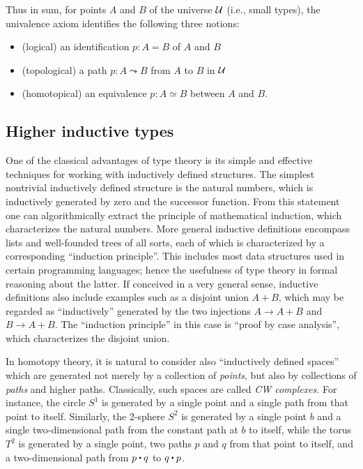 Thus in sum, for points $A$ and $B$ of the universe $\mathcal{U}$ (i.e., small types), the univalence axiom identifies the following three notions:
\begin{itemize}
\item (logical) an identification $p:A=B$ of $A$ and $B$
\item (topological) a path $p:A \leadsto B$ from $A$ to $B$ in $\mathcal{U}$
\item (homotopical) an equivalence $p:A\simeq B$ between $A$ and $B$.
\end{itemize}

\subsection*{Higher inductive types}

One of the classical advantages of type theory is its simple and effective techniques for working with inductively defined structures.
The simplest nontrivial inductively defined structure is the natural numbers, which is inductively generated by zero and the successor function.
From this statement one can algorithmically extract the principle of mathematical induction, which characterizes the natural numbers.
More general inductive definitions encompass lists and well-founded trees of all sorts, each of which is characterized by a corresponding ``induction principle''.
This includes most data structures used in certain programming languages; hence the usefulness of type theory in formal reasoning about the latter.
If conceived in a very general sense, inductive definitions also include examples such as a disjoint union $A+B$, which may be regarded as ``inductively'' generated by the two injections $A\to A+B$ and $B\to A+B$.
The ``induction principle'' in this case is ``proof by case analysis'', which characterizes the disjoint union.

In homotopy theory, it is natural to consider also ``inductively defined spaces'' which are generated not merely by a collection of \emph{points}, but also by collections of \emph{paths} and higher paths.
Classically, such spaces are called \emph{CW complexes}.
For instance, the circle $S^1$ is generated by a single point and a single path from that point to itself.
Similarly, the 2-sphere $S^2$ is generated by a single point $b$ and a single two-dimensional path from the constant path at $b$ to itself, while the torus $T^2$ is generated by a single point, two paths $p$ and $q$ from that point to itself, and a two-dimensional path from $p\ct q$ to $q\ct p$.

